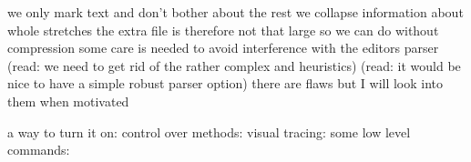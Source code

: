 \startchapter[title=How it works]

\startitemize
    \startitem we only mark text and don't bother about the rest \stopitem
    \startitem we collapse information about whole stretches \stopitem
    \startitem the extra file is therefore not that large \stopitem
    \startitem so we can do without compression \stopitem
    \startitem some care is needed to avoid interference with the editors parser \stopitem
    \startitem (read: we need to get rid of the rather complex and heuristics) \stopitem
    \startitem (read: it would be nice to have a simple robust parser option) \stopitem
    \startitem there are flaws but I will look into them when motivated \stopitem
\stopitemize

\stopchapter

\startchapter[title=What the user gets]

\startitemize
    \startitem a way to turn it on:
        \starttyping
            \setupsynctex[state=start]
        \stoptyping
    \stopitem
    \startitem control over methods:
        \starttyping
            \setupsynctex[method=max]
        \stoptyping
    \stopitem
    \startitem visual tracing:
        \starttyping
        \stoptyping
    \stopitem
    \startitem some low level commands:
        \starttyping
            \synctexresetfilename
            \synctexpause
            \synctexresume
        \stoptyping
    \stopitem
\stopitemize


\stopchapter

\stopdocument
